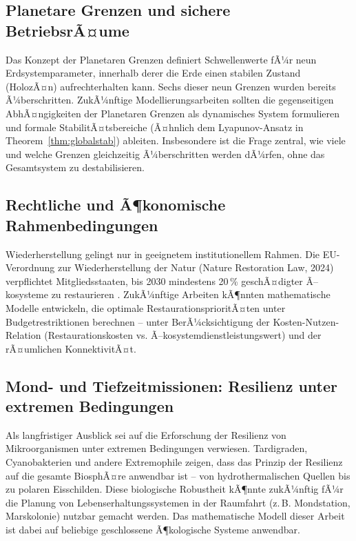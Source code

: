 ﻿\documentclass[a4paper,12pt]{article}
\theoremstyle{definition}
\begin{document}
\subsection{Planetare Grenzen und sichere BetriebsrÃ¤ume}

Das Konzept der Planetaren Grenzen \cite{rockstrom2009safe} definiert Schwellenwerte fÃ¼r neun Erdsystemparameter, innerhalb derer die Erde einen stabilen Zustand (HolozÃ¤n) aufrechterhalten kann. Sechs dieser neun Grenzen wurden bereits Ã¼berschritten. ZukÃ¼nftige Modellierungsarbeiten sollten die gegenseitigen AbhÃ¤ngigkeiten der Planetaren Grenzen als dynamisches System formulieren und formale StabilitÃ¤tsbereiche (Ã¤hnlich dem Lyapunov-Ansatz in Theorem~\ref{thm:globalstab}) ableiten. Insbesondere ist die Frage zentral, wie viele und welche Grenzen gleichzeitig Ã¼berschritten werden dÃ¼rfen, ohne das Gesamtsystem zu destabilisieren.

\subsection{Rechtliche und Ã¶konomische Rahmenbedingungen}

Wiederherstellung gelingt nur in geeignetem institutionellem Rahmen. Die EU-Verordnung zur Wiederherstellung der Natur (Nature Restoration Law, 2024) verpflichtet Mitgliedsstaaten, bis 2030 mindestens 20\,\% geschÃ¤digter Ã–kosysteme zu restaurieren \cite{eu2024nrl}. ZukÃ¼nftige Arbeiten kÃ¶nnten mathematische Modelle entwickeln, die optimale RestaurationsprioritÃ¤ten unter Budgetrestriktionen berechnen -- unter BerÃ¼cksichtigung der Kosten-Nutzen-Relation (Restaurationskosten vs. Ã–kosystemdienstleistungswert) und der rÃ¤umlichen KonnektivitÃ¤t.

\subsection{Mond- und Tiefzeitmissionen: Resilienz unter extremen Bedingungen}

Als langfristiger Ausblick sei auf die Erforschung der Resilienz von Mikroorganismen unter extremen Bedingungen verwiesen. Tardigraden, Cyanobakterien und andere Extremophile zeigen, dass das Prinzip der Resilienz auf die gesamte BiosphÃ¤re anwendbar ist -- von hydrothermalischen Quellen bis zu polaren Eisschilden. Diese biologische Robustheit kÃ¶nnte zukÃ¼nftig fÃ¼r die Planung von Lebenserhaltungssystemen in der Raumfahrt (z.\,B. Mondstation, Marskolonie) nutzbar gemacht werden. Das mathematische Modell dieser Arbeit ist dabei auf beliebige geschlossene Ã¶kologische Systeme anwendbar.
\end{document}
